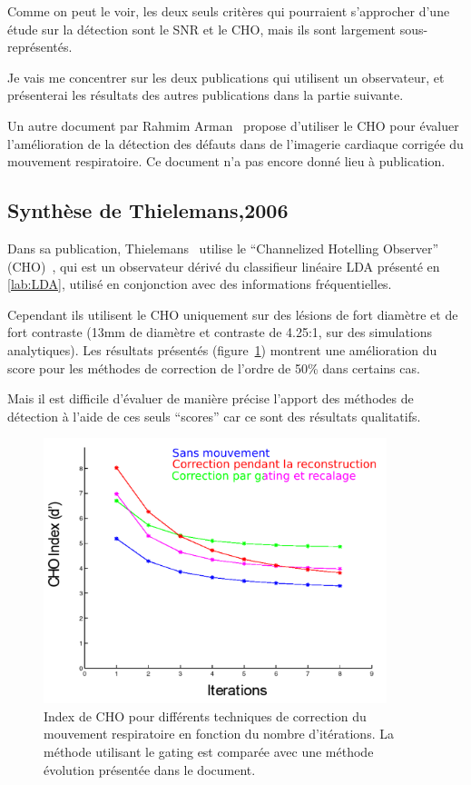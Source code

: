 Comme on peut le voir, les deux seuls critères qui pourraient s'approcher d'une étude sur la détection sont le SNR et le CHO, mais ils sont largement sous-représentés. 

Je vais me concentrer sur les deux publications qui utilisent un observateur, et présenterai les résultats des autres publications dans la partie suivante.

Un autre document par Rahmim Arman~\cite{rahmim4d} propose d'utiliser le CHO pour évaluer l'amélioration de la détection des défauts dans de l'imagerie cardiaque corrigée du mouvement respiratoire. Ce document n'a pas encore donné lieu à publication.

\subsection{Synthèse de Thielemans,2006}


Dans sa publication, Thielemans~\cite{Thielemans2006Lesion} utilise le ``Channelized Hotelling Observer'' (CHO)~\cite{barrett1993model}, qui est un observateur dérivé du classifieur linéaire LDA présenté en \ref{lab:LDA}, utilisé en conjonction avec des informations fréquentielles. 

Cependant ils utilisent le CHO uniquement sur des lésions de fort diamètre et de fort contraste (13mm de diamètre et contraste de 4.25:1, sur des simulations analytiques). Les résultats présentés (figure~\ref{fig:apportCHO}) montrent une amélioration du score pour les méthodes de correction de l'ordre de 50\% dans certains cas. 

Mais il est difficile d'évaluer de manière précise l'apport des méthodes de détection à l'aide de ces seuls ``scores'' car ce sont des résultats qualitatifs. 

\begin{figure}[h!]
	\begin{center}
			\includegraphics[width=10cm]{images/apportCHO}
	\end{center}
	\caption[Index de CHO pour différents techniques de correction du mouvement respiratoire en fonction du nombre d'itérations]{Index de CHO pour différents techniques de correction du mouvement respiratoire en fonction du nombre d'itérations. La méthode utilisant le gating est comparée avec une méthode évolution présentée dans le document.} 
	\label{fig:apportCHO}
\end{figure}


